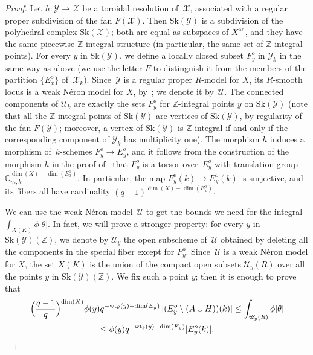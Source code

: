 \documentclass[11pt]{article}
\theoremstyle{definition}
\numberwithin{equation}{subsection}
\newcommand{\Z}{\ensuremath{\mathbb{Z}}}
\newcommand{\cX}{\ensuremath{\mathscr{X}}}
\newcommand{\cU}{\ensuremath{\mathscr{U}}}
\newcommand{\cY}{\ensuremath{\mathscr{Y}}}
\newcommand{\an}{\mathrm{an}}
\newcommand{\Sk}{\mathrm{Sk}}
\newcommand{\wt}{\mathrm{wt}}
\let\form\theta
\begin{document}
\begin{proof}
Let $h\colon \cY\to \cX$ be a toroidal resolution of~$\cX$, associated with a regular proper subdivision of the fan $F(\cX)$.
Then $\Sk(\cY)$ is a subdivision of the polyhedral complex $\Sk(\cX)$; both are equal as subspaces of $X^{\an}$, and they have the same piecewise $\Z$-integral structure (in particular, the same set of $\Z$-integral points).
For every $y$ in $\Sk(\cY)$, we define a locally closed subset $F^o_y$ in $\cY_k$ in the same way as above (we use the letter $F$ to distinguish it from the members of the partition $\{E^o_x\}$ of~$\cX_k$).
Since~$\cY$ is a regular proper $R$\nobreakdash-model for $X$, its $R$\nobreakdash-smooth locus is a weak Néron model for $X$, by~\cite[3.1/2]{BLR}; we denote it by~$\cU$.
The connected components of $\cU_k$ are exactly the sets $F_y^o$ for $\Z$-integral points $y$ on $\Sk(\cY)$ (note that all the $\Z$-integral points of $\Sk(\cY)$ are vertices of $\Sk(\cY)$, by regularity of the fan $F(\cY)$; moreover, a vertex of $\Sk(\cY)$ is $\Z$-integral if and only if the corresponding component of $\cY_k$ has multiplicity one).
The morphism $h$ induces a morphism of~$k$-schemes $F^o_y\to E^o_y$, and it follows from the construction of the morphism $h$ in the
proof of~\cite[9.9]{kato} that $F^o_y$ is a torsor over~$E^o_y$ with translation group
$\mathbb{G}^{\dim(X)-\dim(E_x^o)}_{m,k}$. In particular, the map $F^o_y(k)\to E^o_y(k)$ is surjective, and its fibers all have cardinality $(q-1)^{\dim(X)-\dim(E_x^o)}$.

We can use the weak Néron model~$\cU$ to get the bounds we need for the integral $\int_{X(K)}\phi|\form|$.
In fact, we will prove a stronger property: for every $y$ in $\Sk(\cY)(\Z)$, we denote by $\cU_y$ the open subscheme of~$\cU$
obtained by deleting all the components in the special fiber except for $F^o_y$. Since~$\cU$ is a weak Néron model for $X$, the set $X(K)$ is the union of the compact open subsets $\cU_y(R)$ over all the points $y$ in $\Sk(\cY)(\Z)$. We fix such a point $y$; then it is enough to prove that
\begin{multline*}
\Bigl(\frac{q-1}{q}\Bigr)^{\dim(X)} \phi(y) q^{-\wt_{\form}(y)-\dim(E_y)}\,|(E_y^o\setminus (A\cup H))(k)| \leq \int_{\cU_y(R)}\phi|\form|
\\
\leq \phi(y)q^{-\wt_{\form}(y)-\dim(E_y)}|E_y^o(k)|.
\end{multline*}


\end{proof}
\end{document}
